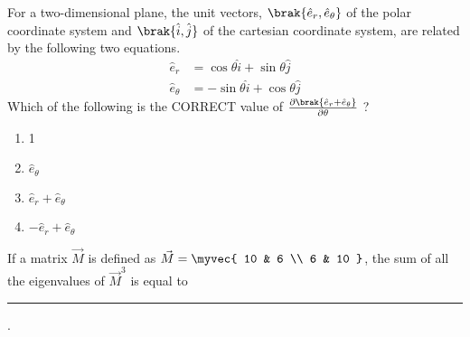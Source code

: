     \item For a two-dimensional plane, the unit vectors, $\brak{\hat{e}_{r}, \hat{e}_{\theta}}$ of the polar coordinate system and $\brak{\hat{i}, \hat{j}}$ of the cartesian coordinate system, are related by the following two equations.
    \begin{align*}
        \hat{e}_{r} &= \cos\theta \hat{i} + \sin\theta \hat{j} \\
        \hat{e}_{\theta} &= -\sin\theta \hat{i} + \cos\theta \hat{j}
    \end{align*}
    Which of the following is the CORRECT value of $\frac{\partial \brak{\hat{e}_{r} + \hat{e}_{\theta}}}{\partial \theta}$ ?
\hfill{}
\begin{multicols}{4}
\begin{enumerate}
    \item 1
    \item $\hat{e}_{\theta}$
    \item $\hat{e}_{r} + \hat{e}_{\theta}$
    \item $-\hat{e}_{r} + \hat{e}_{\theta}$
\end{enumerate}
\end{multicols}
    \item If a matrix $\vec{M}$ is defined as $\vec{M} =\myvec{
    10 & 6 \\
    6 & 10 
    }$, the sum of all the eigenvalues of $\vec{M}^3$ is
equal to \rule{40pt}{0.1mm}.
    \hfill{}
